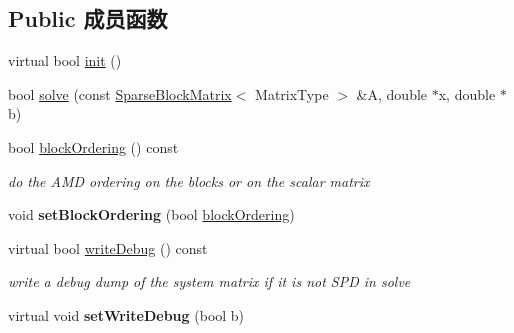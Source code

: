 \subsection*{Public 成员函数}
\begin{DoxyCompactItemize}
\item 
virtual bool \hyperlink{classg2o_1_1LinearSolverEigen_a8fca4bb987dcbeb94a366b1532dee139}{init} ()
\item 
bool \hyperlink{classg2o_1_1LinearSolverEigen_ae4ac566af324a238a31145c1e50b52e1}{solve} (const \hyperlink{classg2o_1_1SparseBlockMatrix}{Sparse\-Block\-Matrix}$<$ Matrix\-Type $>$ \&A, double $\ast$x, double $\ast$b)
\item 
\hypertarget{classg2o_1_1LinearSolverEigen_a962d9062e095399706ae4614f058a27c}{bool \hyperlink{classg2o_1_1LinearSolverEigen_a962d9062e095399706ae4614f058a27c}{block\-Ordering} () const }\label{classg2o_1_1LinearSolverEigen_a962d9062e095399706ae4614f058a27c}

\begin{DoxyCompactList}\small\item\em do the A\-M\-D ordering on the blocks or on the scalar matrix \end{DoxyCompactList}\item 
\hypertarget{classg2o_1_1LinearSolverEigen_a33a924364fc517e69c5ade5aeacd8ee3}{void {\bfseries set\-Block\-Ordering} (bool \hyperlink{classg2o_1_1LinearSolverEigen_a962d9062e095399706ae4614f058a27c}{block\-Ordering})}\label{classg2o_1_1LinearSolverEigen_a33a924364fc517e69c5ade5aeacd8ee3}

\item 
\hypertarget{classg2o_1_1LinearSolverEigen_a6b70f3c7b1c8c8105c05c7c560c670c2}{virtual bool \hyperlink{classg2o_1_1LinearSolverEigen_a6b70f3c7b1c8c8105c05c7c560c670c2}{write\-Debug} () const }\label{classg2o_1_1LinearSolverEigen_a6b70f3c7b1c8c8105c05c7c560c670c2}

\begin{DoxyCompactList}\small\item\em write a debug dump of the system matrix if it is not S\-P\-D in solve \end{DoxyCompactList}\item 
\hypertarget{classg2o_1_1LinearSolverEigen_a5ceaab3ba944d327b21f7329c7e19c8c}{virtual void {\bfseries set\-Write\-Debug} (bool b)}\label{classg2o_1_1LinearSolverEigen_a5ceaab3ba944d327b21f7329c7e19c8c}

\end{DoxyCompactItemize}
